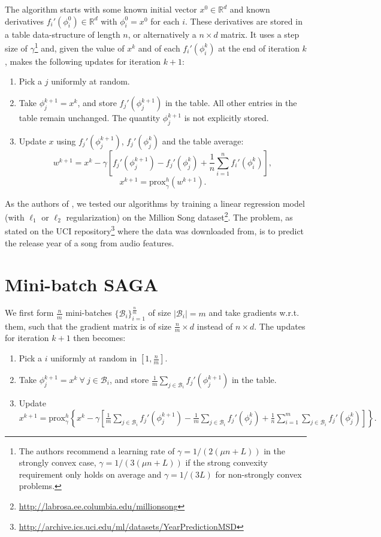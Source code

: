 \documentclass[a4paper,10pt]{article}
\newcommand{\R}{\mathbb{R}}
\newcommand{\B}{\mathcal{B}}
\newcommand{\prox}{\textrm{prox}}
\begin{document}
The algorithm starts with some known initial vector $x^0 \in \R^d$ and known
derivatives $f_i' (\phi_i^0) \in \R^d$ with $\phi_i^0 = x^0$ for each $i$. These
derivatives are stored in a table data-structure of length $n$, or alternatively
a $n \times d$ matrix. It uses a step size of $\gamma$\footnote{The authors
recommend a learning rate of $\gamma=1/(2(\mu n+L))$ in the strongly convex
case, $\gamma=1/(3(\mu n+L))$ if the strong convexity requirement only holds on
average and $\gamma=1/(3L)$ for non-strongly convex problems.} and, given the
value of $x^k$ and of each $f_i' (\phi_i^k)$ at the end of iteration $k$, makes
the following updates for iteration $k+1$:
\begin{enumerate}
\item Pick a $j$ uniformly at random.
\item Take $\phi_j^{k+1} = x^k$, and store $f_j'(\phi_j^{k+1})$ in the table.
	All other entries in the table remain unchanged. The quantity $\phi_j^{k+1}$
	is not explicitly stored.
\item Update $x$ using $f_j'(\phi_j^{k+1})$, $f_j'(\phi_j^k)$ and the table
	average:
	\begin{equation} \label{eqn:saga}
	w^{k+1} = x^k - \gamma \left[ f_j'(\phi_j^{k+1}) - f_j'(\phi_j^k)
	+ \frac1n \sum_{i=1}^n f_i'(\phi_i^k) \right] ,
	\end{equation}
	$$x^{k+1} = \prox_\gamma^h (w^{k+1}).$$
\end{enumerate}

As the authors of \cite{defazio_saga_2014}, we tested our algorithms by training
a linear regression model (with $\ell_1$ or $\ell_2$ regularization) on the
Million Song dataset\footnote{
\url{http://labrosa.ee.columbia.edu/millionsong}}. The problem, as stated on the
UCI repository\footnote{
\url{http://archive.ics.uci.edu/ml/datasets/YearPredictionMSD}} where the data
was downloaded from, is to predict the release year of a song from audio
features.

\section{Mini-batch SAGA}

We first form $\frac{n}m$ mini-batches $\{\B_i\}_{i=1}^{\frac{n}m}$ of size
$|\B_i| = m$ and take gradients w.r.t. them, such that the gradient matrix is of
size $\frac{n}m \times d$ instead of $n \times d$. The updates for iteration
$k+1$ then becomes:
\begin{enumerate}
\item Pick a $i$ uniformly at random in $[1, \frac{n}m]$.
\item Take $\phi_j^{k+1} = x^k \ \forall \ j \in \B_i$, and store $\frac1m
	\sum_{j\in\B_i} f_j'(\phi_j^{k+1})$ in the table.
\item Update $x^{k+1}= \prox_\gamma^h \left\{ x^k - \gamma \left[ \frac1m \sum_{j\in\B_i} f_j'(\phi_j^{k+1})
	- \frac1m \sum_{j\in\B_i} f_j'(\phi_j^k)
	+ \frac1n \sum_{i=1}^m \sum_{j\in\B_i} f_j'(\phi_j^k) \right] \right\}.$
\end{enumerate}
\end{document}
